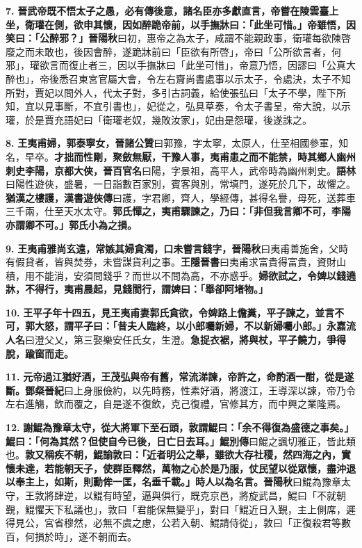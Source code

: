\textbf{7.} \textbf{晉武帝既不悟太子之愚，必有傳後意，諸名臣亦多獻直言，帝嘗在陵雲臺上坐，衛瓘在側，欲申其懷，因如醉跪帝前，以手撫牀曰：「此坐可惜。」帝雖悟，因笑曰：「公醉邪？」}{\footnotesize \textbf{晉陽秋}曰初，惠帝之為太子，咸謂不能親政事，衛瓘每欲陳啓廢之而未敢也，後因會醉，遂跪牀前曰「臣欲有所啓」，帝曰「公所欲言者，何邪」，瓘欲言而復止者三，因以手撫牀曰「此坐可惜」，帝意乃悟，因謬曰「公真大醉也」，帝後悉召東宮官屬大會，令左右齎尚書處事以示太子，令處決，太子不知所對，賈妃以問外人，代太子對，多引古詞義，給使張弘曰「太子不學，陛下所知，宜以見事斷，不宜引書也」，妃從之，弘具草奏，令太子書呈，帝大說，以示瓘，於是賈充語妃曰「衛瓘老奴，幾敗汝家」，妃由是怨瓘，後遂誅之。}

\textbf{8.} \textbf{王夷甫婦，郭泰寧女，}{\footnotesize \textbf{晉諸公贊}曰郭豫，字太寧，太原人，仕至相國參軍，知名，早卒。}\textbf{才拙而性剛，聚斂無厭，干豫人事，夷甫患之而不能禁，時其鄉人幽州刺史李陽，京都大俠，}{\footnotesize \textbf{晉百官名}曰陽，字景祖，高平人，武帝時為幽州刺史。\textbf{語林}曰陽性遊俠，盛暑，一日詣數百家別，賓客與別，常填門，遂死於几下，故懼之。}\textbf{猶漢之樓護，}{\footnotesize \textbf{漢書遊俠傳}曰護，字君卿，齊人，學經傳，甚得名譽，母死，送葬車三千兩，仕至天水太守。}\textbf{郭氏憚之，夷甫驟諫之，乃曰：「非但我言卿不可，李陽亦謂卿不可。」郭氏小為之損。}

\textbf{9.} \textbf{王夷甫雅尚玄遠，常嫉其婦貪濁，口未嘗言錢字，}{\footnotesize \textbf{晉陽秋}曰夷甫善施舍，父時有假貸者，皆與焚券，未嘗謀貨利之事。\textbf{王隱晉書}曰夷甫求富貴得富貴，資財山積，用不能消，安須問錢乎？而世以不問為高，不亦惑乎。}\textbf{婦欲試之，令婢以錢遶牀，不得行，夷甫晨起，見錢閡行，謂婢曰：「舉卻阿堵物。」}

\textbf{10.} \textbf{王平子年十四五，見王夷甫妻郭氏貪欲，令婢路上儋糞，平子諫之，並言不可，郭大怒，謂平子曰：「昔夫人臨終，以小郎囑新婦，不以新婦囑小郎。」}{\footnotesize \textbf{永嘉流人名}曰澄父乂，第三娶樂安任氏女，生澄。}\textbf{急捉衣裾，將與杖，平子饒力，爭得脫，踰窗而走。}

\textbf{11.} \textbf{元帝過江猶好酒，王茂弘與帝有舊，常流涕諫，帝許之，命酌酒一酣，從是遂斷。}{\footnotesize \textbf{鄧粲晉紀}曰上身服儉約，以先時務，性素好酒，將渡江，王導深以諫，帝乃令左右進觴，飲而覆之，自是遂不復飲，克己復禮，官修其方，而中興之業隆焉。}

\textbf{12.} \textbf{謝鯤為豫章太守，從大將軍下至石頭，敦謂鯤曰：「余不得復為盛德之事矣。」鯤曰：「何為其然？但使自今已後，日亡日去耳。」}{\footnotesize \textbf{鯤別傳}曰鯤之諷切雅正，皆此類也。}\textbf{敦又稱疾不朝，鯤諭敦曰：「近者明公之舉，雖欲大存社稷，然四海之內，實懷未達，若能朝天子，使群臣釋然，萬物之心於是乃服，仗民望以從眾懷，盡沖退以奉主上，如斯，則勳侔一匡，名垂千載。」時人以為名言。}{\footnotesize \textbf{晉陽秋}曰鯤為豫章太守，王敦將肆逆，以鯤有時望，逼與俱行，既克京邑，將旋武昌，鯤曰「不就朝覲，鯤懼天下私議也」，敦曰「君能保無變乎」，對曰「鯤近日入覲，主上側席，遲得見公，宮省穆然，必無不虞之慮，公若入朝、鯤請侍從」，敦曰「正復殺君等數百，何損於時」，遂不朝而去。}

